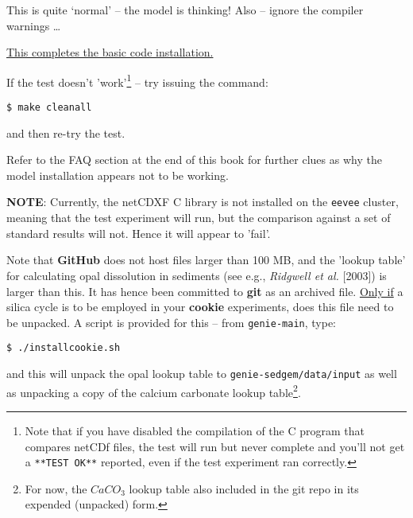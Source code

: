 \noindent This is quite ‘normal’ – the model is thinking! Also -- ignore the compiler warnings … 

\vspace{1mm}
\noindent \uline{This completes the basic code installation.}

\vspace{1mm}
\noindent If the test doesn't 'work'\footnote{Note that if you have disabled the compilation of the C program that compares netCDf files, the test will run but never complete and you'll not get a \texttt{**TEST OK**} reported, even if the test experiment ran correctly.} -- try issuing the command:
\vspace{-2mm}
\small\begin{verbatim}
$ make cleanall
\end{verbatim}\normalsize
\vspace{-2mm}

\noindent and then re-try the test. 

Refer to the FAQ section at the end of this book for further clues as why the model installation appears not to be working.\

\textbf{NOTE}: Currently, the netCDXF C library is not installed on the \texttt{eevee}
 cluster, meaning that the test experiment will run, but the comparison against a set of standard results will not. Hence it will appear to 'fail'.

\newpage

\noindent Note that \textbf{GitHub} does not host files larger than 100 MB, and the 'lookup table' for calculating opal dissolution in sediments (see e.g., \textit{Ridgwell et al.} [2003]) is larger than this. It has hence been committed to \textbf{git} as an archived file. \uline{Only if} a silica cycle is to be employed in your \textbf{cookie} experiments, does this file need to be unpacked. A script is provided for this -- from \texttt{genie-main}, type:

\vspace{-2mm}
\begin{verbatim}
$ ./installcookie.sh
\end{verbatim}
\vspace{-2mm}

\noindent and this will unpack the opal lookup table to \texttt{genie-sedgem/data/input} as well as unpacking a copy of the calcium carbonate lookup table\footnote{For now, the \(CaCO_{3}\) lookup table also included in the git repo in its expended (unpacked) form.}.

